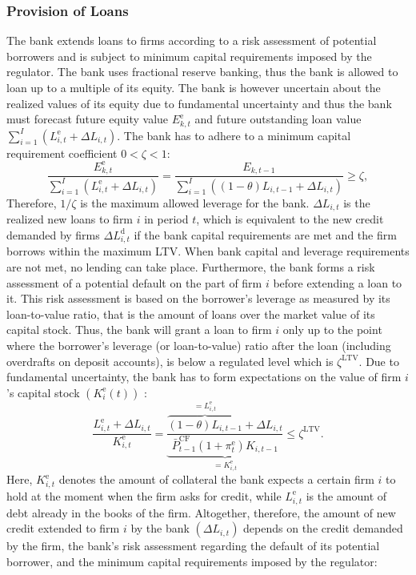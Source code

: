 \subsubsection{Provision of Loans}
The bank extends loans to firms according to a risk assessment of potential borrowers and is subject to minimum capital requirements imposed by the regulator. The bank uses fractional reserve banking, thus the bank is allowed to loan up to a multiple of its equity. The bank is however uncertain about the realized values of its equity due to fundamental uncertainty and thus the bank must forecast future equity value $E_{k,t}^{\mathrm{e}}$ and future outstanding loan value $\sum_{i=1}^I\left(L_{i,t}^{\mathrm{e}}+\Delta L_{i,t}\right)$. The bank has to adhere to a minimum capital requirement coefficient $0<\zeta<1$:
\begin{equation}
\frac{E_{k,t}^{\mathrm{e}}}{\sum_{i=1}^I\left(L_{i,t}^{\mathrm{e}}+\Delta L_{i,t}\right)}=\frac{E_{k,t-1}}{\sum_{i=1}^I\left((1-\theta) L_{i,t-1}+\Delta L_{i,t}\right)} \geq \zeta,
\end{equation}
Therefore, $1/\zeta$ is the maximum allowed leverage for the bank. $\Delta L_{i,t}$ is the realized new loans to firm $i$ in period $t$, which is equivalent to the new credit demanded by firms $\Delta L_{i,t}^{\mathrm{d}}$ if the bank capital requirements are met and the firm borrows within the maximum LTV. When bank capital and leverage requirements are not met, no lending can take place.
Furthermore, the bank forms a risk assessment of a potential default on the part of firm $i$ before extending a loan to it. This risk assessment is based on the borrower's leverage as measured by its loan-to-value ratio, that is the amount of loans over the market value of its capital stock. Thus, the bank will grant a loan to firm $i$ only up to the point where the borrower's leverage (or loan-to-value) ratio after the loan (including overdrafts on deposit accounts), is below a regulated level which is $\zeta^{\mathrm{LTV}}$. Due to fundamental uncertainty, the bank has to form expectations on the value of firm $i$ 's capital stock $\left(K_i^{\mathrm{e}}(t)\right)$ :
\begin{equation}
\frac{L_{i,t}^{\mathrm{e}}+\Delta L_{i,t}}{K_{i,t}^{\mathrm{e}}}=\underbrace{\frac{\overbrace{(1-\theta) L_{i,t-1}}^{=L_{i,t}^{\mathrm{e}}}+\Delta L_{i,t}}{\bar{P}^{\mathrm{CF}}_{t-1}\left(1+\pi_t^{\mathrm{e}}\right) K_{i,t-1}}}_{=K_{i,t}^{\mathrm{e}}} \leq \zeta^{\mathrm{LTV}} .
\end{equation}
Here, $K_{i,t}^{\mathrm{e}}$ denotes the amount of collateral the bank expects a certain firm $i$ to hold at the moment when the firm asks for credit, while $L_{i,t}^{\mathrm{e}}$ is the amount of debt already in the books of the firm.  Altogether, therefore, the amount of new credit extended to firm $i$ by the bank $\left(\Delta L_{i,t}\right)$ depends on the credit demanded by the firm, the bank's risk assessment regarding the default of its potential borrower, and the minimum capital requirements imposed by the regulator:
